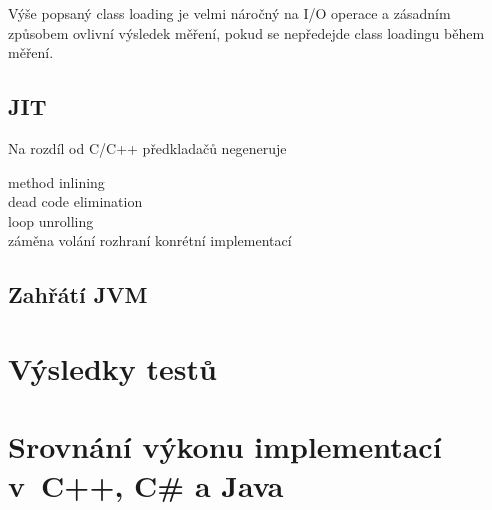 Výše popsaný class loading je velmi náročný na I/O operace a zásadním způsobem ovlivní výsledek měření, pokud se nepředejde class loadingu během měření.

\subsection{JIT}
Na rozdíl od C/C++ předkladačů negeneruje 
\begin{description}
\item[method inlining]
\item[dead code elimination]
\item[loop unrolling]
\item[záměna volání rozhraní konrétní implementací]
\end{description}
\subsection{Zahřátí JVM}

\section{Výsledky testů}


\section{Srovnání výkonu implementací v~C++, C\# a Java}

